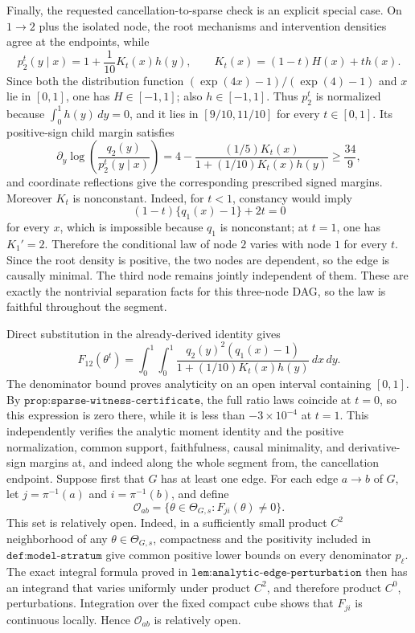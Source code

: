 Finally, the requested cancellation-to-sparse check is an explicit special case. On \(1\to2\) plus the isolated node, the root mechanisms and intervention densities agree at the endpoints, while
\[
 p_2^t(y\mid x)=1+\frac{1}{10}K_t(x)h(y),
 \qquad
 K_t(x)=(1-t)H(x)+t h(x).
\]
Since both the distribution function \((\exp(4x)-1)/(\exp(4)-1)\) and \(x\) lie in \([0,1]\), one has \(H\in[-1,1]\); also \(h\in[-1,1]\). Thus \(p_2^t\) is normalized because \(\int_0^1h(y)\,dy=0\), and it lies in \([9/10,11/10]\) for every \(t\in[0,1]\). Its positive-sign child margin satisfies
\[
 \partial_y\log\!\left(\frac{q_2(y)}{p_2^t(y\mid x)}\right)
 =4-\frac{(1/5)K_t(x)}{1+(1/10)K_t(x)h(y)}
 \ge \frac{34}{9},
\]
and coordinate reflections give the corresponding prescribed signed margins. Moreover \(K_t\) is nonconstant. Indeed, for \(t<1\), constancy would imply
\[
 (1-t)\{q_1(x)-1\}+2t=0
\]
for every \(x\), which is impossible because \(q_1\) is nonconstant; at \(t=1\), one has \(K_1'=2\). Therefore the conditional law of node \(2\) varies with node \(1\) for every \(t\). Since the root density is positive, the two nodes are dependent, so the edge is causally minimal. The third node remains jointly independent of them. These are exactly the nontrivial separation facts for this three-node DAG, so the law is faithful throughout the segment.

Direct substitution in the already-derived identity gives
\[
 F_{12}(\theta^t)=
 \int_0^1\!\int_0^1
 \frac{q_2(y)^2(q_1(x)-1)}{1+(1/10)K_t(x)h(y)}\,dx\,dy.
\]
The denominator bound proves analyticity on an open interval containing \([0,1]\). By \(\texttt{prop:sparse-witness-certificate}\), the full ratio laws coincide at \(t=0\), so this expression is zero there, while it is less than \(-3\times10^{-4}\) at \(t=1\). This independently verifies the analytic moment identity and the positive normalization, common support, faithfulness, causal minimality, and derivative-sign margins at, and indeed along the whole segment from, the cancellation endpoint.
Suppose first that \(G\) has at least one edge. For each edge \(a\to b\) of \(G\), let \(j=\pi^{-1}(a)\) and \(i=\pi^{-1}(b)\), and define
\[
 \mathcal O_{ab}
 =\{\theta\in\Theta_{G,s}:F_{ji}(\theta)\ne0\}.
\]
This set is relatively open. Indeed, in a sufficiently small product \(C^2\) neighborhood of any \(\theta\in\Theta_{G,s}\), compactness and the positivity included in \(\texttt{def:model-stratum}\) give common positive lower bounds on every denominator \(p_\ell\). The exact integral formula proved in \(\texttt{lem:analytic-edge-perturbation}\) then has an integrand that varies uniformly under product \(C^2\), and therefore product \(C^0\), perturbations. Integration over the fixed compact cube shows that \(F_{ji}\) is continuous locally. Hence \(\mathcal O_{ab}\) is relatively open.

